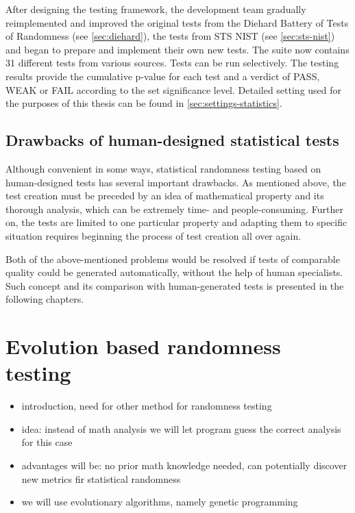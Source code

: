 \documentclass[12pt,oneside]{fithesis2}
\begin{document}
After designing the testing framework, the development team gradually reimplemented and improved the original tests from 
the Diehard Battery of Tests of Randomness (see \autoref{sec:diehard}), 
the tests from STS NIST (see \autoref{sec:sts-nist}) and began to prepare and implement their own new tests.
The suite now contains 31 different tests from various sources. Tests can be run selectively.
The testing results provide the cumulative p-value for each test and a verdict of \textsc{PASS}, \textsc{WEAK} or \textsc{FAIL}
according to the set significance level.
Detailed setting used for the purposes of this thesis can be found in \autoref{sec:settings-statistics}.

\section{Drawbacks of human-designed statistical tests}
\label{sec:limits-stat-testing}

Although convenient in some ways, statistical randomness testing based on human-designed tests has several important drawbacks.
As mentioned above, the test creation must be preceded by an idea of mathematical property and its thorough analysis, 
which can be extremely time- and people-consuming. Further on, the tests are limited to one particular property and
adapting them to specific situation requires beginning the process of test creation all over again.

Both of the above-mentioned problems would be resolved if tests of comparable quality could be generated automatically, without 
the help of human specialists. Such concept and its comparison with human-generated tests is presented in the following chapters.

\chapter{Evolution based randomness testing}
\label{chap:evo-based-testing}

\begin{itemize}
\item introduction, need for other method for randomness testing
\item idea: instead of math analysis we will let program guess the correct analysis for this case
\item advantages will be: no prior math knowledge needed, can potentially discover new metrics fir statistical randomness
\item we will use evolutionary algorithms, namely genetic programming
\end{itemize}
\end{document}
